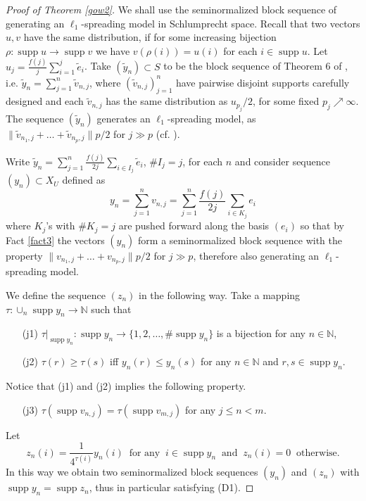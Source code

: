 \documentclass{amsart}
\numberwithin{subsection}{section}
\numberwithin{equation}{section}
\begin{document}
\begin{proof}[Proof of Theorem \ref{gow2}]
We shall use the seminormalized block sequence of \cite{KL} generating an $\ell_1$-spreading model in Schlumprecht space. Recall that two vectors $u,v$ have the same distribution, if for some increasing bijection $\rho: \operatorname{supp} u\to\operatorname{supp} v$ we have $v(\rho (i))=u(i)$ for each $i\in\operatorname{supp} u$. Let $u_j=\frac{f(j)}{j}\sum_{i=1}^j\tilde{e}_i$. Take $(\tilde{y}_n)\subset S$ to be the block sequence of Theorem 6 of \cite{KL}, i.e. $\tilde{y}_n=\sum_{j=1}^n\tilde{v}_{n,j}$, where $(\tilde{v}_{n,j})_{j=1}^n$ have pairwise disjoint supports carefully designed and each $\tilde{v}_{n,j}$ has the same distribution as $u_{p_j}/2$, for some fixed $p_j\nearrow \infty$.  The sequence $(\tilde{y}_n)$ generates an $\ell_1$-spreading model, as ${\lVert \tilde{v}_{n_1,j}+\dots+\tilde{v}_{n_p,j}\rVert} p/2$ for $j\gg p$ (cf. \cite{KL}). 

Write $\tilde{y}_n=\sum_{j=1}^n\frac{f(j)}{2j}\sum_{i\in I_j}\tilde{e}_i$, $\# I_j=j$, for each $n$ and consider sequence $(y_n)\subset X_U$ defined as
$$
y_n=\sum_{j=1}^nv_{n,j}=\sum_{j=1}^n\frac{f(j)}{2j}\sum_{i\in K_j}e_i
$$
where $K_j$'s with $\# K_j=j$ are pushed forward along the basis $(e_i)$ so that by Fact \ref{fact3} the vectors $(y_n)$ form a seminormalized block sequence  with the property ${\lVert v_{n_1,j}+\dots+v_{n_p,j}\rVert} p/2$ for $j\gg p$, therefore also generating an $\ell_1$-spreading model. 

We define the sequence $(z_n)$ in the following way. Take a mapping $\tau:\cup_n\operatorname{supp} y_n\to{{\mathbb{N}}}$ such that 
\begin{enumerate}
 \item[(j1)] $\tau|_{\operatorname{supp} y_n}:\operatorname{supp} y_n\to \{1,2,\dots, \#\operatorname{supp} y_n\}$ is a bijection for any $n\in{{\mathbb{N}}}$,
\item[(j2)] $\tau(r)\geq \tau(s)$ iff $y_n(r)\leq y_n(s)$ for any $n\in{{\mathbb{N}}}$ and $r,s\in\operatorname{supp} y_n$.
\end{enumerate}
Notice that (j1) and (j2) implies the following property.
\begin{enumerate}
 \item[(j3)] $\tau(\operatorname{supp} v_{n,j})=\tau(\operatorname{supp} v_{m,j})$ for any $j\leq n<m$.
\end{enumerate}
Let 
$$
z_n(i)=\frac{1}{4^{\tau(i)}}y_n(i) \ \text{ for any }\  i\in\operatorname{supp} y_n \ \text{ and }\ z_n(i)=0 \ \text{ otherwise.}
$$
In this way we obtain two seminormalized block sequences $(y_n)$ and $(z_n)$ with $\operatorname{supp} y_n=\operatorname{supp} z_n$, thus in particular satisfying (D1). 
 

\end{proof}
\end{document}
